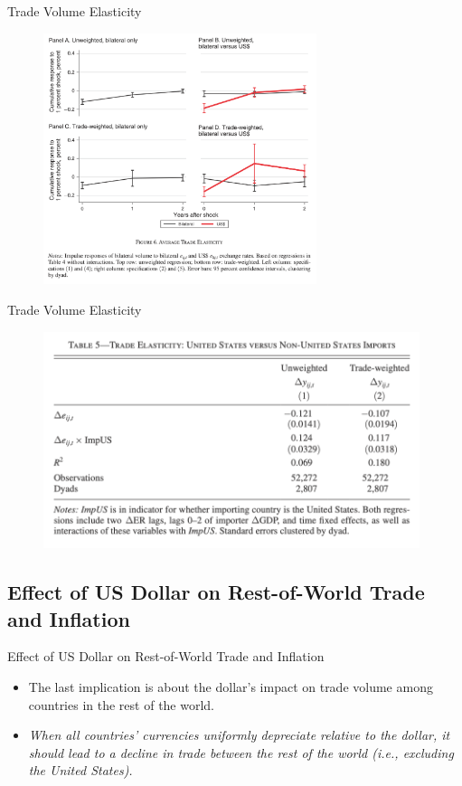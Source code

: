 \documentclass{beamer}
\begin{document}
\begin{frame}{Trade Volume Elasticity}
    \begin{figure}[htp]
        \centering
        \includegraphics[width=8cm]{Figure6.png}
    \end{figure}
\end{frame}
\begin{frame}{Trade Volume Elasticity}
    \begin{figure}[htp]
        \centering
        \includegraphics[width=11cm]{Table5.png}
    \end{figure}
\end{frame}
\subsection{Effect of US Dollar on Rest-of-World Trade and Inflation}
\begin{frame}{Effect of US Dollar on Rest-of-World Trade and Inflation}
    \begin{itemize}
        \item The last implication is about the dollar's impact on trade volume among countries in the rest of the world.
        \item \emph{When all countries’ currencies uniformly depreciate relative to the dollar, it should lead to a decline in trade between the rest of the world (i.e., excluding the United States).}
\end{itemize}
\end{frame}
\end{document}
